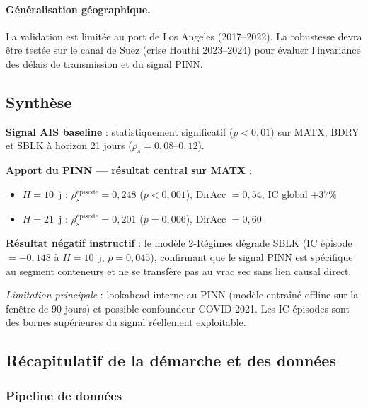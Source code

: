 \paragraph{Généralisation géographique.}
La validation est limitée au port de Los Angeles (2017--2022). La robustesse
devra être testée sur le canal de Suez (crise Houthi 2023--2024) pour
évaluer l'invariance des délais de transmission et du signal PINN.

\bigskip

\subsection{Synthèse}

\begin{tcolorbox}[colback=gray!8, colframe=gray!50,
                  title=Résultats clés --- Phase 4]
\textbf{Signal AIS baseline} : statistiquement significatif ($p < 0{,}01$)
sur MATX, BDRY et SBLK à horizon 21 jours ($\rho_s = 0{,}08$--$0{,}12$).

\medskip
\textbf{Apport du PINN --- résultat central sur MATX} :
\begin{itemize}
    \item $H = 10$~j : $\rho_s^{\text{épisode}} = 0{,}248$ ($p < 0{,}001$),
    DirAcc $= 0{,}54$, IC global $+37\%$
    \item $H = 21$~j : $\rho_s^{\text{épisode}} = 0{,}201$ ($p = 0{,}006$),
    DirAcc $= 0{,}60$
\end{itemize}

\medskip
\textbf{Résultat négatif instructif} : le modèle 2-Régimes dégrade SBLK
(IC épisode $= -0{,}148$ à $H = 10$~j, $p = 0{,}045$), confirmant que le
signal PINN est spécifique au segment conteneurs et ne se transfère pas
au vrac sec sans lien causal direct.

\medskip
\textit{Limitation principale} : lookahead interne au PINN (modèle entraîné
offline sur la fenêtre de 90 jours) et possible confoundeur COVID-2021. Les
IC épisodes sont des bornes supérieures du signal réellement exploitable.
\end{tcolorbox}

\bigskip

\subsection{Récapitulatif de la démarche et des données}

\subsubsection{Pipeline de données}

